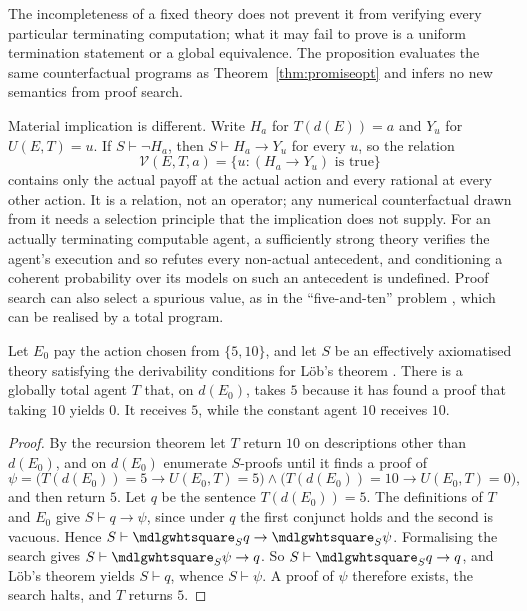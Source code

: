 The incompleteness of a fixed theory does not prevent it from verifying every particular terminating
computation; what it may fail to prove is a uniform termination statement or a global equivalence.
The proposition evaluates the same counterfactual programs as Theorem~\ref{thm:promiseopt} and infers
no new semantics from proof search.

Material implication is different. Write $H_a$ for $T(d(E))=a$ and $Y_u$ for $U(E,T)=u$. If
$S\vdash\neg H_a$, then $S\vdash H_a\to Y_u$ for every $u$, so the relation
\[
  \mathcal V(E,T,a)=\{u: (H_a\to Y_u)\text{ is true}\}
\]
contains only the actual payoff at the actual action and every rational at every other action. It is
a relation, not an operator; any numerical counterfactual drawn from it needs a selection principle
that the implication does not supply. For an actually terminating computable agent, a sufficiently
strong theory verifies the agent's execution and so refutes every non-actual antecedent, and
conditioning a coherent probability over its models on such an antecedent is undefined. Proof search
can also select a spurious value, as in the \enquote{five-and-ten} problem
\autocite[§2.1]{demskigarrabrant2019}, which can be realised by a total program.

\begin{theorem}\label{thm:fiveten}
Let $E_0$ pay the action chosen from $\{5,10\}$, and let $S$ be an effectively axiomatised theory
satisfying the derivability conditions for Löb's theorem \autocite{lob1955}. There is a globally
total agent $T$ that, on $d(E_0)$, takes $5$ because it has found a proof that taking $10$ yields $0$.
It receives $5$, while the constant agent $10$ receives $10$.
\end{theorem}

\begin{proof}
By the recursion theorem let $T$ return $10$ on descriptions other than $d(E_0)$, and on $d(E_0)$
enumerate $S$-proofs until it finds a proof of
\[
  \psi=\bigl(T(d(E_0))=5\to U(E_0,T)=5\bigr)\wedge\bigl(T(d(E_0))=10\to U(E_0,T)=0\bigr),
\]
and then return $5$. Let $q$ be the sentence $T(d(E_0))=5$. The definitions of $T$ and $E_0$ give
$S\vdash q\to\psi$, since under $q$ the first conjunct holds and the second is vacuous. Hence
$S\vdash\Prov_Sq\to\Prov_S\psi$. Formalising the search gives $S\vdash\Prov_S\psi\to q$. So
$S\vdash\Prov_Sq\to q$, and Löb's theorem yields $S\vdash q$, whence $S\vdash\psi$. A proof of $\psi$
therefore exists, the search halts, and $T$ returns $5$.
\end{proof}

